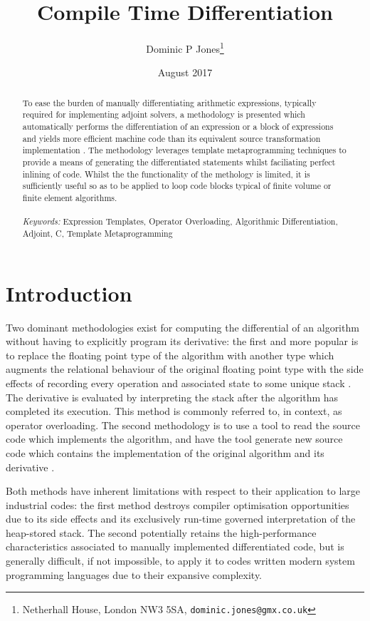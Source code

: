 \documentclass[a4paper,10pt]{article}
\title{Compile Time Differentiation}
\author{Dominic P Jones\footnote{Netherhall House, London NW3 5SA, \texttt{dominic.jones@gmx.co.uk}}}
\date{August 2017}
\def\CC{{C\nolinebreak[4]\hspace{-.05em}\raisebox{.4ex}{\tiny\bf ++}}}
\begin{document}
\maketitle


\begin{abstract}
To ease the burden of manually differentiating arithmetic expressions, typically required for implementing adjoint solvers, a methodology is presented which automatically performs the differentiation of an expression or a block of expressions and yields more efficient machine code than its equivalent source transformation implementation \citep{TapenadeRef13}. The methodology leverages template metaprogramming techniques to provide a means of generating the differentiated statements whilst faciliating perfect inlining of code. Whilst the the functionality of the methology is limited, it is sufficiently useful so as to be applied to loop code blocks typical of finite volume or finite element algorithms.
\\\\{\noindent \emph{Keywords:} Expression Templates, Operator Overloading, Algorithmic Differentiation, Adjoint, {\CC}, Template Metaprogramming }
\end{abstract}


\section{Introduction}
Two dominant methodologies exist for computing the differential of an algorithm without having to explicitly program its derivative: the first and more popular is to replace the floating point type of the algorithm with another type which augments the relational behaviour of the original floating point type with the side effects of recording every operation and associated state to some unique stack \citep{Griewank1999ACA}.
The derivative is evaluated by interpreting the stack after the algorithm has completed its execution. This method is commonly referred to, in context, as operator overloading. The second methodology is to use a tool to read the source code which implements the algorithm, and have the tool generate new source code which contains the implementation of the original algorithm and its derivative \citep{TapenadeRef13}.

Both methods have inherent limitations with respect to their application to large industrial codes: the first method destroys compiler optimisation opportunities due to its side effects and its exclusively run-time governed interpretation of the heap-stored stack. The second potentially retains the high-performance characteristics associated to manually implemented differentiated code, but is generally difficult, if not impossible, to apply it to codes written modern system programming languages due to their expansive complexity.
\end{document}

